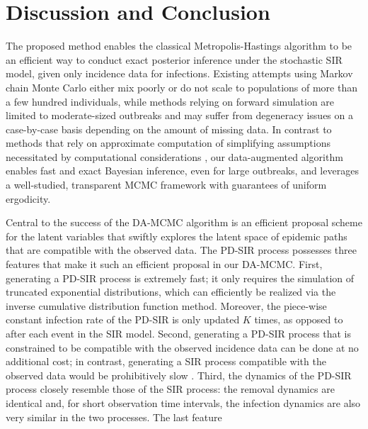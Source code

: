 \documentclass[11pt]{article}
\begin{document}
	\section{Discussion and Conclusion}
	\label{sec:dis}
	The proposed method enables the classical Metropolis-Hastings algorithm to be an efficient way to conduct exact posterior inference under the stochastic SIR model, given only incidence data for infections. Existing attempts using Markov chain Monte Carlo either mix poorly or do not scale to populations of more than a few hundred individuals, while methods relying on forward simulation are limited to moderate-sized outbreaks and may suffer from degeneracy issues on a case-by-case basis depending on the amount of missing data. %
	In contrast to methods that rely on approximate computation of simplifying assumptions necessitated by computational considerations \cite{McKinley.2018,Fintzi.2020}, 
	our data-augmented algorithm enables fast and exact Bayesian inference, even for large outbreaks, and leverages a well-studied, transparent MCMC framework with  guarantees of uniform ergodicity. %
	
	Central to the success of the DA-MCMC algorithm is an efficient proposal scheme for the latent variables that swiftly explores the latent space of epidemic paths that are compatible with the observed data. The PD-SIR process possesses three features that make it such an efficient proposal in our DA-MCMC. First, generating a PD-SIR process is extremely fast; it only requires the simulation of truncated exponential distributions, which can efficiently be realized via the inverse cumulative distribution function method. Moreover, the piece-wise constant infection rate of the PD-SIR is only updated $K$ times, as opposed to after each event in the SIR model. Second, generating a PD-SIR process that is constrained to be compatible with the observed incidence data can be done at no additional cost; in contrast, generating a SIR process compatible with the observed data would be prohibitively slow \cite{Hobolth.2009}. Third, the dynamics of the PD-SIR process closely resemble those of the SIR process: the removal dynamics are identical and, for short observation time intervals, the infection dynamics are also very similar in the two processes. The last feature 
	
\end{document}
